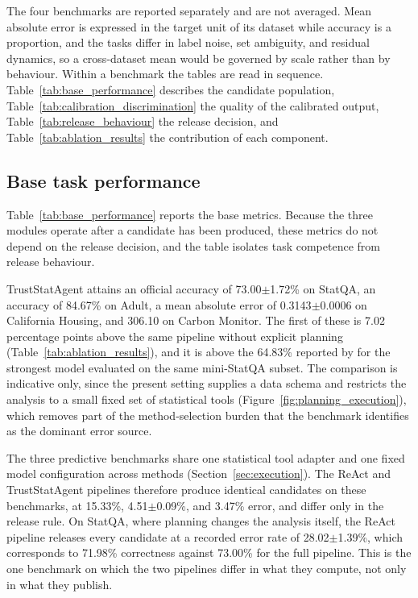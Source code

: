 \documentclass[preprint,12pt,authoryear]{elsarticle}
\begin{document}
The four benchmarks are reported separately and are not averaged.
Mean absolute error is expressed in the target unit of its dataset while accuracy is a proportion, and the tasks differ in label noise, set ambiguity, and residual dynamics, so a cross-dataset mean would be governed by scale rather than by behaviour.
Within a benchmark the tables are read in sequence.
Table~\ref{tab:base_performance} describes the candidate population, Table~\ref{tab:calibration_discrimination} the quality of the calibrated output, Table~\ref{tab:release_behaviour} the release decision, and Table~\ref{tab:ablation_results} the contribution of each component.

\subsection{Base task performance}
\label{sec:results_base}

Table~\ref{tab:base_performance} reports the base metrics.
Because the three modules operate after a candidate has been produced, these metrics do not depend on the release decision, and the table isolates task competence from release behaviour.

TrustStatAgent attains an official accuracy of 73.00$\pm$1.72\% on StatQA, an accuracy of 84.67\% on Adult, a mean absolute error of 0.3143$\pm$0.0006 on California Housing, and 306.10 on Carbon Monitor.
The first of these is 7.02 percentage points above the same pipeline without explicit planning (Table~\ref{tab:ablation_results}), and it is above the 64.83\% reported by \citet{zhu2024large} for the strongest model evaluated on the same mini-StatQA subset.
The comparison is indicative only, since the present setting supplies a data schema and restricts the analysis to a small fixed set of statistical tools (Figure~\ref{fig:planning_execution}), which removes part of the method-selection burden that the benchmark identifies as the dominant error source.

The three predictive benchmarks share one statistical tool adapter and one fixed model configuration across methods (Section~\ref{sec:execution}).
The ReAct and TrustStatAgent pipelines therefore produce identical candidates on these benchmarks, at 15.33\%, 4.51$\pm$0.09\%, and 3.47\% error, and differ only in the release rule.
On StatQA, where planning changes the analysis itself, the ReAct pipeline releases every candidate at a recorded error rate of 28.02$\pm$1.39\%, which corresponds to 71.98\% correctness against 73.00\% for the full pipeline.
This is the one benchmark on which the two pipelines differ in what they compute, not only in what they publish.
\end{document}
